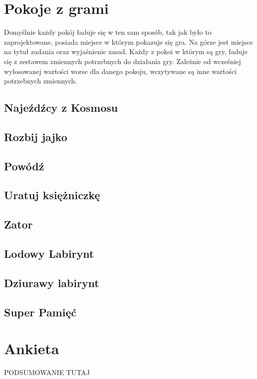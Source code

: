 \documentclass[openright]{xmgr}
\begin{document}
\section{Pokoje z grami}
Domyślnie każdy pokój ładuje się w ten sam sposób, tak jak było to zaprojektowane, posiada miejsce w którym pokazuje się gra. Na górze jest miejsce na tytuł zadania oraz wyjaśnienie zasad. Każdy z pokoi w którym są gry, ładuje się z zestawem zmiennych potrzebnych do działania gry. Zależnie od wcześniej wylosowanej wartości worse dla danego pokoju, wczytywane są inne wartości potrzebnych zmiennych.

\subsection{Najeźdźcy z Kosmosu}
\subsection{Rozbij jajko}
\subsection{Powódź}
\subsection{Uratuj księżniczkę}
\subsection{Zator}
\subsection{Lodowy Labirynt}
\subsection{Dziurawy labirynt}
\subsection{Super Pamięć}

\section{Ankieta}





\summary

PODSUMOWANIE TUTAJ

\appendix
\end{document}
